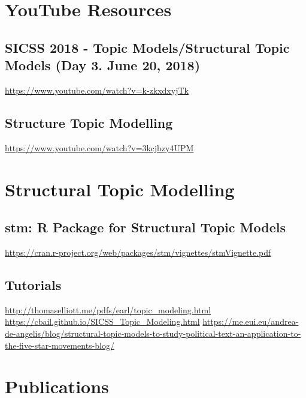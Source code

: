 \documentclass[
]{book}
\begin{document}
\hypertarget{youtube-resources}{%
\chapter{YouTube Resources}\label{youtube-resources}}

\hypertarget{sicss-2018---topic-modelsstructural-topic-models-day-3.-june-20-2018}{%
\section{SICSS 2018 - Topic Models/Structural Topic Models (Day 3. June 20, 2018)}\label{sicss-2018---topic-modelsstructural-topic-models-day-3.-june-20-2018}}

\url{https://www.youtube.com/watch?v=k-zkxdxyjTk}

\hypertarget{structure-topic-modelling}{%
\section{Structure Topic Modelling}\label{structure-topic-modelling}}

\url{https://www.youtube.com/watch?v=3kcjbzy4UPM}

\hypertarget{structural-topic-modelling}{%
\chapter{Structural Topic Modelling}\label{structural-topic-modelling}}

\hypertarget{stm-r-package-for-structural-topic-models}{%
\section{stm: R Package for Structural Topic Models}\label{stm-r-package-for-structural-topic-models}}

\url{https://cran.r-project.org/web/packages/stm/vignettes/stmVignette.pdf}

\hypertarget{tutorials}{%
\section{Tutorials}\label{tutorials}}

\url{http://thomaselliott.me/pdfs/earl/topic_modeling.html}
\url{https://cbail.github.io/SICSS_Topic_Modeling.html}
\url{https://me.eui.eu/andrea-de-angelis/blog/structural-topic-models-to-study-political-text-an-application-to-the-five-star-movements-blog/}

\hypertarget{publications}{%
\chapter{Publications}\label{publications}}
\end{document}
